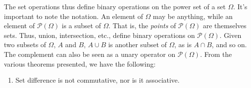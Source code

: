         The set operations thus define binary operations
        on the power set of a set $\Omega$. It's important
        to note the notation. An element of $\Omega$ may
        be anything, while an element of
        $\mathcal{P}(\Omega)$ is a subset of $\Omega$.
        That is, the \textit{points} of $\mathcal{P}(\Omega)$
        are themselves sets. Thus, union, intersection,
        etc., define binary operations on
        $\mathcal{P}(\Omega)$. Given two subsets of
        $\Omega$, $A$ and $B$, $A\cup{B}$ is another
        subset of $\Omega$, as is $A\cap{B}$, and so on.
        The complement can also be seen as a unary operator
        on $\mathcal{P}(\Omega)$. From the various theorems
        presented, we have the following:
        \begin{enumerate}
            \item Set difference is not commutative,
                  nor is it associative.
        \end{enumerate}
